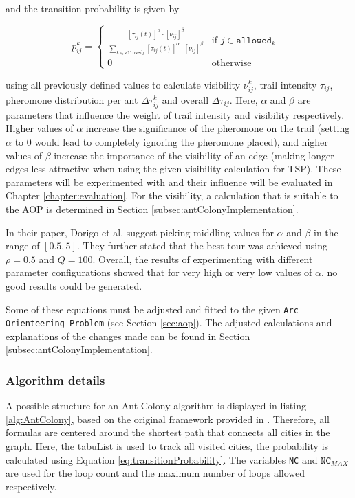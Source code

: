 and the transition probability is given by

\begin{equation}\label{eq:transitionProbability}
	p_{ij}^k = \begin{cases}
		\frac{[\tau_{ij}(t)]^{\alpha} \cdot [\nu_{ij}]^{\beta}}{\sum_{k \in \texttt{allowed}_k} [\tau_{ij}(t)]^{\alpha} \cdot [\nu_{ij}]^{\beta}} &\text{if $j \in \texttt{allowed}_k$ }\\
		0 &\text{otherwise}
	\end{cases}
\end{equation}

using all previously defined values to calculate visibility $\nu_{ij}^k$, trail intensity $\tau_{ij}$, pheromone distribution per ant  $\Delta\tau_{ij}^k$ and overall $\Delta\tau_{ij}$.
Here, $\alpha$ and $\beta$ are parameters that influence the weight of trail intensity and visibility respectively.
Higher values of $\alpha$ increase the significance of the pheromone on the trail (setting $\alpha$ to 0 would lead to completely ignoring the pheromone placed), and higher values of $\beta$ increase the importance of the visibility of an edge (making longer edges less attractive when using the given visibility calculation for TSP).
These parameters will be experimented with and their influence will be evaluated in Chapter \ref{chapter:evaluation}.
For the visibility, a calculation that is suitable to the AOP is determined in Section \ref{subsec:antColonyImplementation}.

In their paper, Dorigo et al. suggest picking middling values for $\alpha$ and $\beta$ in the range of $[0.5,5]$.
They further stated that the best tour was achieved using $\rho = 0.5$ and $Q=100$.
Overall, the results of experimenting with different parameter configurations showed that for very high or very low values of $\alpha$, no good results could be generated.


Some of these equations must be adjusted and fitted to the given \texttt{Arc Orienteering Problem} (see Section \ref{sec:aop}). 
The adjusted calculations and explanations of the changes made can be found in Section \ref{subsec:antColonyImplementation}.


\subsubsection{Algorithm details}
\label{subsubsec:antPseudocode}

A possible structure for an Ant Colony algorithm is displayed in listing \ref{alg:AntColony}, based on the original framework provided in \cite{dorigo_ant_1996}.
Therefore, all formulas are centered around the shortest path that connects all cities in the graph.
Here, the tabuList is used to track all visited cities, the probability is calculated using Equation \ref{eq:transitionProbability}. 
The variables \texttt{NC} and $\texttt{NC}_{MAX}$ are used for the loop count and the maximum number of loops allowed respectively.

